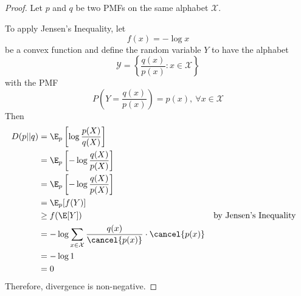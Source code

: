 \documentclass[
  coursecode={MTHE 474},
  assignmentname={Homework \homeworknumber},
  studentnumber=20053722,
  name={Bryan Hoang},
  draft,
]{
  ltxanswer%
}
\begin{document}
\begin{questions}
\begin{parts}
      \part{}
      \begin{solution}
        \begin{proof}
          Let \(p\) and \(q\) be two PMFs on the same alphabet \(\mathcal{X}\).

          To apply Jensen's Inequality, let
          \begin{equation*}
            f(x)=-\log x
          \end{equation*}
          be a convex function and define the random variable \(Y\) to have the alphabet
          \begin{equation*}
            \mathcal{Y}=\left\{\frac{q(x)}{p(x)} : x \in \mathcal{X}\right\}
          \end{equation*}
          with the PMF
          \begin{equation*}
            P\left(Y=\frac{q(x)}{p(x)}\right)=p(x),\ \forall x \in \mathcal{X}
          \end{equation*}
          Then
          \begin{align*}
            D(p||q) &= \E_{p}\left[\log\frac{p(X)}{q(X)}\right]                                                                    \\
                    &= \E_{p}\left[-\log\frac{q(X)}{p(X)}\right]                                                                   \\
                    &= \E_{p}\left[-\log\frac{q(X)}{p(X)}\right]                                                                   \\
                    &= \E_{p}[f(Y)]                                                                                                \\
                    &\ge f(\E[Y])                                                                 & &\text{by Jensen's Inequality} \\
                    &= -\log\sum_{x\in\mathcal{X}} \frac{q(x)}{\cancel{p(x)}} \cdot \cancel{p(x)}                                  \\
                    &= -\log 1                                                                                                     \\
                    &= 0
          \end{align*}
          Therefore, divergence is non-negative.
        \end{proof}
      \end{solution}
    \end{parts}
  \end{questions}
\end{document}
